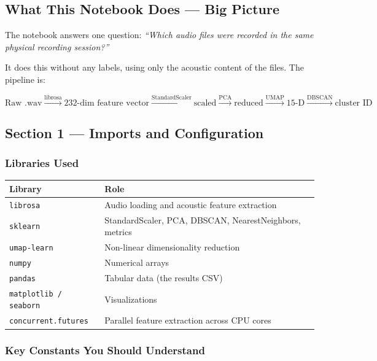 \documentclass[12pt,a4paper]{article}
\begin{document}
\subsection{What This Notebook Does --- Big Picture}

The notebook answers one question: \textit{``Which audio files were recorded in the same physical recording session?''}

It does this without any labels, using only the acoustic content of the files. The pipeline is:

\[
\text{Raw .wav} \xrightarrow{\text{librosa}} \text{232-dim feature vector} \xrightarrow{\text{StandardScaler}} \text{scaled} \xrightarrow{\text{PCA}} \text{reduced} \xrightarrow{\text{UMAP}} \text{15-D} \xrightarrow{\text{DBSCAN}} \text{cluster ID}
\]

\subsection{Section 1 --- Imports and Configuration}

\subsubsection{Libraries Used}

\begin{center}
\begin{tabular}{ll}
\toprule
\textbf{Library} & \textbf{Role} \\
\midrule
\texttt{librosa} & Audio loading and acoustic feature extraction \\
\texttt{sklearn} & StandardScaler, PCA, DBSCAN, NearestNeighbors, metrics \\
\texttt{umap-learn} & Non-linear dimensionality reduction \\
\texttt{numpy} & Numerical arrays \\
\texttt{pandas} & Tabular data (the results CSV) \\
\texttt{matplotlib / seaborn} & Visualizations \\
\texttt{concurrent.futures} & Parallel feature extraction across CPU cores \\
\bottomrule
\end{tabular}
\end{center}

\subsubsection{Key Constants You Should Understand}
\end{document}
